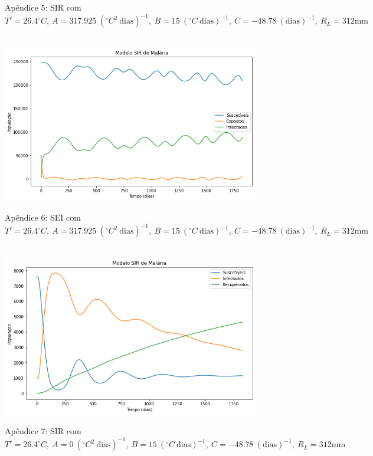 \documentclass[
	12pt,				%
	oneside,			%
	a4paper,			%
	english,			%
	brazil				%
	]{abntex2}
\begin{document}
\begin{apendicesenv}
\begin{figure}[!ht]
	\caption*{Apêndice 5: SIR com $T'=26.4^\circ C, \ A=317.925 \ (^\circ C^2 \ \text{dias})^{-1}, \ B=15 \ (^\circ C \ \text{dias})^{-1}, \ C=-48.78 \ (\text{dias})^{-1}, \ R_L=312 \text{mm}$}
\end{figure} 
\begin{figure}[!ht]
	\centering
	\hbox{\hspace{2.4em} \includegraphics[scale=0.55] {SEI_Correcao_b3.png}}
	\caption*{Apêndice 6: SEI com $T'=26.4^\circ C, \ A=317.925 \ (^\circ C^2 \ \text{dias})^{-1}, \ B=15 \ (^\circ C \ \text{dias})^{-1}, \ C=-48.78 \ (\text{dias})^{-1}, \ R_L=312 \text{mm}$}
\end{figure}
\newpage
\begin{figure}[!ht]
	\centering
	\hbox{\hspace{2.5em} \includegraphics[scale=0.55] {SIR_Correcao_b3_A0.png}}
	\caption*{Apêndice 7: SIR com $T'=26.4^\circ C, \ A=0 \ (^\circ C^2 \ \text{dias})^{-1}, \ B=15 \ (^\circ C \ \text{dias})^{-1}, \ C=-48.78 \ (\text{dias})^{-1}, \ R_L=312 \text{mm}$}

\end{figure}
\end{apendicesenv}
\end{document}
